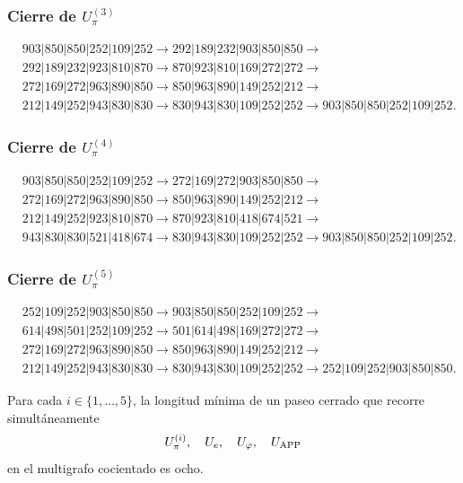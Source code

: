 \subsubsection{Cierre de \texorpdfstring{\(U_\pi^{(3)}\)}{U-pi 3}}
\begin{align*}
&903|850|850|252|109|252\to
292|189|232|903|850|850\to\\
&292|189|232|923|810|870\to
870|923|810|169|272|272\to\\
&272|169|272|963|890|850\to
850|963|890|149|252|212\to\\
&212|149|252|943|830|830\to
830|943|830|109|252|252\to
903|850|850|252|109|252.
\end{align*}

\subsubsection{Cierre de \texorpdfstring{\(U_\pi^{(4)}\)}{U-pi 4}}
\begin{align*}
&903|850|850|252|109|252\to
272|169|272|903|850|850\to\\
&272|169|272|963|890|850\to
850|963|890|149|252|212\to\\
&212|149|252|923|810|870\to
870|923|810|418|674|521\to\\
&943|830|830|521|418|674\to
830|943|830|109|252|252\to
903|850|850|252|109|252.
\end{align*}

\subsubsection{Cierre de \texorpdfstring{\(U_\pi^{(5)}\)}{U-pi 5}}
\begin{align*}
&252|109|252|903|850|850\to
903|850|850|252|109|252\to\\
&614|498|501|252|109|252\to
501|614|498|169|272|272\to\\
&272|169|272|963|890|850\to
850|963|890|149|252|212\to\\
&212|149|252|943|830|830\to
830|943|830|109|252|252\to
252|109|252|903|850|850.
\end{align*}

\begin{theorem}
\label{p12-83-c9-s1:thm:minimalidad-cierres-pi-autonoma}
Para cada \(i\in\{1,\ldots,5\}\), la longitud mínima de un paseo cerrado
que recorre simultáneamente
\[
 U_\pi^{(i)},\quad U_e,\quad U_\varphi,\quad U_{\rm APP}
\]
en el multigrafo cocientado es ocho.
\end{theorem}

